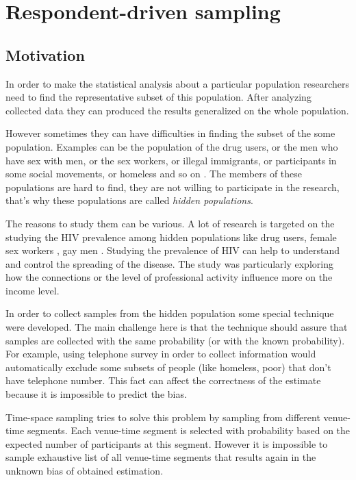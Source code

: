 \documentclass[12pt]{report}
\begin{document}
\chapter{Respondent-driven sampling}

\section{Motivation}

In order to make the statistical analysis about a particular population researchers need to find the representative subset of this population. After analyzing collected data they can produced the results generalized on the whole population.

However sometimes they can have difficulties in finding the subset of the some population. Examples can be the population of the drug users, or the men who have sex with men, or the sex workers, or illegal immigrants, or participants in some social movements, or homeless and so on \cite{salganik2004sampling}. The members of these populations are hard to find, they are not willing to participate in the research, that's why these populations are called \textit{hidden populations}.

The reasons to study them can be various. A lot of research is targeted on the studying the HIV prevalence among hidden populations like drug users, female sex workers \cite{musyoki2015prevalence}, gay men \cite{ramirez2005networks}. Studying the prevalence of HIV can help to understand and control the spreading of the disease. The study \cite{heckathorn2003jazz} was particularly exploring how the connections or the level of professional activity influence more on the income level.




In order to collect samples from the hidden population some special technique were developed. The main challenge here is that the technique should assure that samples are collected with the same probability (or with the known probability). For example, using telephone survey in order to collect information would automatically exclude some subsets of people (like homeless, poor) that don't have telephone number. This fact can affect the correctness of the estimate because it is impossible to predict the bias. 

Time-space sampling tries to solve this problem by sampling from different venue-time segments. Each venue-time segment is selected with probability based on the expected number of participants at this segment. However it is impossible to sample exhaustive list of all venue-time segments that results again in the  unknown bias of obtained estimation.
\end{document}
